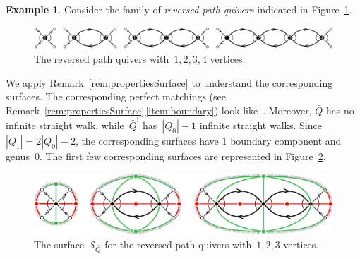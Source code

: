 \documentclass{amsart}
\theoremstyle{definition}
\newtheorem{example}[theorem]{Example}
\newcommand{\fref}[1]{Figure~\ref{#1}} %
\newcommand{\darkblue}{\color{darkblue}} %
\newcommand{\defn}[1]{\textsl{\darkblue #1}} %
\newcommand{\surface}{\mathcal{S}} %
\newcommand{\koszul}{^!} %
\begin{document}
\begin{example}
\label{exm:reversedPath}
Consider the family of \defn{reversed path quivers} indicated in \fref{fig:reversedPathsQuivers}.

\begin{figure}[h]
	\capstart
	\centerline{\includegraphics[scale=.45]{reversedPathsQuivers}}
	\caption{The reversed path quivers with~$1, 2, 3, 4$ vertices.}
	\label{fig:reversedPathsQuivers}
\end{figure}

We apply Remark~\ref{rem:propertiesSurface} to understand the corresponding surfaces.
The corresponding perfect matchings (see Remark~\ref{rem:propertiesSurface}\,\eqref{item:boundary}) look like~.
Moreover, $\bar Q$ has no infinite straight walk, while~$\bar Q\koszul$ has~$|Q_0|-1$ infinite straight walks.
Since~$|Q_1| = 2|Q_0|-2$, the corresponding surfaces have $1$ boundary component and genus~$0$.
The first few corresponding surfaces are represented in \fref{fig:reversedPathsSurfaces}.

\begin{figure}[h]
	\capstart
	\centerline{\includegraphics[scale=.7]{reversedPathsSurfaces3}}
	\caption{The surface~$\surface_{\bar Q}$ for the reversed path quivers with~$1, 2, 3$ vertices.}
	\label{fig:reversedPathsSurfaces}
\end{figure}
\end{example}
\end{document}
